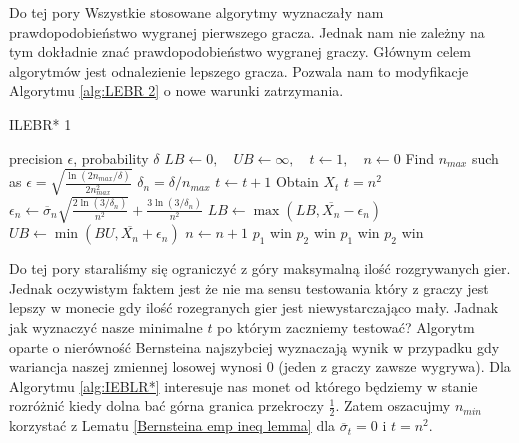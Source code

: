 \documentclass[inzynierska]{pwr_wmat_praca_dyplomowa}
\theoremstyle{plain}
\numberwithin{theorem}{chapter}
\theoremstyle{definition}
\numberwithin{theorem}{chapter}
\begin{document}
	Do tej pory Wszystkie stosowane algorytmy wyznaczały nam prawdopodobieństwo wygranej pierwszego gracza. Jednak nam nie zależny na tym dokładnie znać prawdopodobieństwo wygranej graczy. Głównym celem algorytmów jest odnalezienie lepszego gracza. Pozwala nam to modyfikacje Algorytmu \ref{alg:LEBR 2} o nowe warunki zatrzymania.
	\begin{algorithm}[H]\captionsetup{labelformat=custom2}
		\caption{ILEBR* 1}\label{alg:IEBLR* 1}
		\begin{algorithmic}
			\Ensure precision $\epsilon$, probability $\delta$ 
			\State  $ LB \gets 0,\quad UB \gets \infty,\quad t \gets 1,\quad n \gets 0 $
			\State Find $n_{max}$ such as $		\epsilon =  \sqrt{\frac{\ln(2n_{max}/\delta)}{2n_{max}^2}} $
			\Statex $\delta_n = \delta/n_{max}$
			\Repeat 
			\State $t \gets t + 1$
			\State Obtain $X_t$
			\Until $t=n^2$
			\State $\epsilon_n \gets \overline{\sigma}_n \sqrt{\frac{2\ln(3/\delta_n)}{n^2}} + \frac{3  \ln{(3 / \delta_n)}}{n^2}$ 
			\State $LB \gets \max(LB,  \overline{X_n} - \epsilon_n)$
			\State $UB \gets \min(BU,  \overline{X_n} + \epsilon_n)$
			\State $n \gets n + 1$
			\EndWhile
			\State \Return $p_1$ win
			\State \Return $p_2$ win
			\State \Return $p_1$ win
			\Else
			\State \Return $p_2$ win
			\EndIf
		\end{algorithmic}
	\end{algorithm}
	Do tej pory staraliśmy się ograniczyć z góry maksymalną ilość rozgrywanych gier. Jednak oczywistym faktem jest że nie ma sensu testowania który z graczy jest lepszy w monecie gdy ilość rozegranych gier jest niewystarczająco mały. Jadnak jak wyznaczyć nasze minimalne $t$ po którym zaczniemy testować? Algorytm oparte o nierówność Bernsteina najszybciej wyznaczają wynik w przypadku gdy wariancja naszej zmiennej losowej wynosi 0 (jeden z graczy zawsze wygrywa). Dla Algorytmu \ref{alg:IEBLR*} interesuje nas monet od którego będziemy w stanie rozróżnić kiedy dolna bać górna granica przekroczy $\frac{1}{2}$. Zatem oszacujmy $n_{min}$ korzystać z Lematu \ref{Bernsteina emp ineq lemma} dla $\overline{\sigma}_t=0$ i $t = n^2$.  
	
	
	
\end{document}
